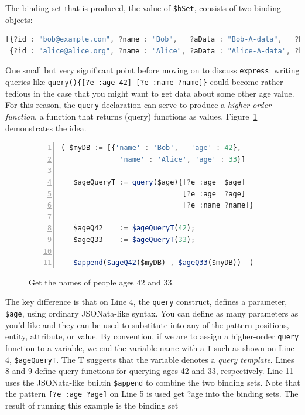 \documentclass[9pt,letterpaper]{article}
\newcommand{\stt}[1]{\texttt{#1}} %
\begin{document}
The binding set that is produced, the value of \stt{\$bSet}, consists of two binding objects:

\begin{lstlisting}[language=JavaScript,numbers=none,basicstyle=\ttfamily\scriptsize]
[{?id : "bob@example.com", ?name : "Bob",   ?aData : "Bob-A-data",   ?bData : "Bob-B-data"  },
 {?id : "alice@alice.org", ?name : "Alice", ?aData : "Alice-A-data", ?bData : "Alice-B-data"}]
\end{lstlisting} \vspace{-2em}

One small but very significant point before moving on to discuss \stt{express}:
writing queries like \stt{query()\{[?e :age 42] [?e :name ?name]\}} could become rather tedious in the case that you might want to get data about some other age value.
For this reason, the \stt{query} declaration can serve to produce a \textit{higher-order function}, a function that returns (query) functions as values. Figure~\ref{code:higher-order-query} demonstrates the idea.


\begin{figure}[H]
    \caption{Get the names of people ages 42 and 33.}
    \label{code:higher-order-query}
\begin{lstlisting}[language=JavaScript,numberstyle=\scriptsize,basicstyle=\ttfamily\scriptsize,numbers=left,stepnumber=1,breaklines=true]
 ( $myDB := [{'name' : 'Bob',   'age' : 42},
              'name' : 'Alice', 'age' : 33}]

   $ageQueryT := query($age){[?e :age  $age]
                             [?e :age  ?age]
                             [?e :name ?name]}

   $ageQ42    := $ageQueryT(42);
   $ageQ33    := $ageQueryT(33);

   $append($ageQ42($myDB) , $ageQ33($myDB))  )
\end{lstlisting}
\end{figure} \vspace{-2em}

The key difference is that on Line 4, the \stt{query} construct, defines a parameter, \stt{\$age}, using ordinary JSONata-like syntax.
You can define as many parameters as you'd like and they can be used to substitute into any of the pattern positions, entity, attribute, or value.
By convention, if we are to assign a higher-order \stt{query} function to a variable, we end the variable name with a \stt{T} such as shown on Line 4, \stt{\$ageQueryT}.
The T suggests that the variable denotes a \textit{query template}.
Lines 8 and 9 define query functions for querying ages 42 and 33, respectively.
Line 11 uses the JSONata-like builtin \stt{\$append} to combine the two binding sets.
Note that the pattern \stt{[?e :age ?age]} on Line 5 is used get ?age into the binding sets.
The result of running this example is the binding set
\end{document}
